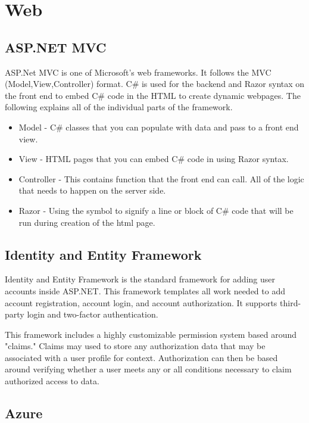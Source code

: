 
\section{Web}

\subsection{ASP.NET MVC}
ASP.Net MVC is one of Microsoft's web frameworks. It follows the MVC (Model,View,Controller) format.
C\# is used for the backend and Razor syntax on the front end to embed C\# code in the HTML to create dynamic webpages.
The following explains all of the individual parts of the framework.

\begin{itemize}
    \item Model - C\# classes that you can populate with data and pass to a front end view.
    \item View - HTML pages that you can embed C\# code in using Razor syntax.
    \item Controller - This contains function that the front end can call. All of the logic that needs to happen on the server side.
    \item Razor - Using the \@ symbol to signify a line or block of C\# code that will be run during creation of the html page.
\end{itemize}
\subsection{Identity and Entity Framework}
Identity and Entity Framework is the standard framework for adding user accounts inside ASP.NET. This framework templates all work needed to add account registration, account login, and account authorization. It supports third-party login and two-factor authentication. 

This framework includes a highly customizable permission system based around "claims." Claims may used to store any authorization data that may be associated with a user profile for context. Authorization can then be based around verifying whether a user meets any or all conditions necessary to claim authorized access to data. 

\subsection{Azure}
